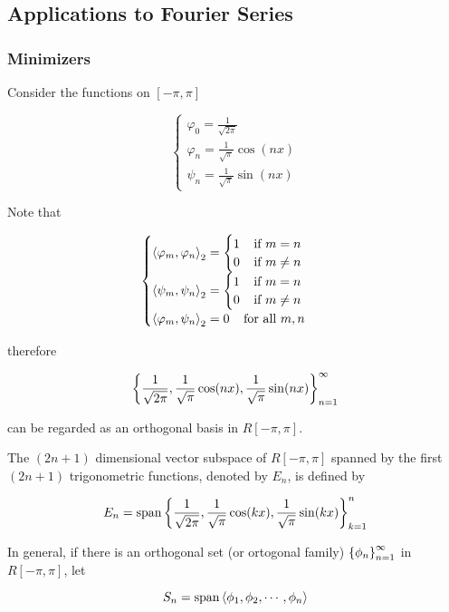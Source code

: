 \documentclass[a4paper,12pt]{article}
\begin{document}
\subsection{Applications to Fourier Series}
\subsubsection{Minimizers}
Consider the functions on $[-\pi,\pi]$

$$\begin{cases}
  \varphi_{0}=\frac{1}{\sqrt{2\pi}}\\
  \varphi_{n}=\frac{1}{\sqrt{\pi}}\cos(nx)\\
  \psi_{n}=\frac{1}{\sqrt{\pi}}\sin(nx)
\end{cases}$$\s

Note that

$$\begin{cases}
  \left\langle \varphi_{m},\varphi_{n}\right\rangle_{2}=\begin{cases}
    1\;\;\;\;\text{if }m=n\\
    0\;\;\;\;\text{if }m\neq n
  \end{cases}\\
  \left\langle \psi_{m},\psi_{n}\right\rangle_{2}=\begin{cases}
    1\;\;\;\;\text{if }m=n\\
    0\;\;\;\;\text{if }m\neq n
  \end{cases}\\
  \left\langle \varphi_{m},\psi_{n}\right\rangle_{2}=0\;\;\;\;\text{for all }m,n
\end{cases}$$\s

therefore

$$\left\{ \frac{1}{\sqrt{2\pi}},\frac{1}{\sqrt{\pi}}\cos(nx),\frac{1}{\sqrt{\pi}}\sin(nx)\right\}_{n=1}^{\infty}$$\s

can be regarded as an orthogonal basis in $R[-\pi,\pi]$.\n

\begin{dft}
  The $(2n+1)$ dimensional vector subspace of $R[-\pi,\pi]$ spanned by the first $(2n+1)$ trigonometric functions, denoted by $E_{n}$, is defined by

  $$E_{n}=\mathrm{span}\left\{ \frac{1}{\sqrt{2\pi}},\frac{1}{\sqrt{\pi}}\cos(kx),\frac{1}{\sqrt{\pi}}\sin(kx)\right\}_{k=1}^{n}$$
\end{dft}\n

In general, if there is an orthogonal set (or ortogonal family) $\left\{ \phi_{n}\right\}_{n=1}^{\infty}$ in $R[-\pi,\pi]$, let

$$S_{n}=\mathrm{span}\left\langle \phi_{1},\phi_{2},\cdots,\phi_{n}\right\rangle$$\s
\end{document}
